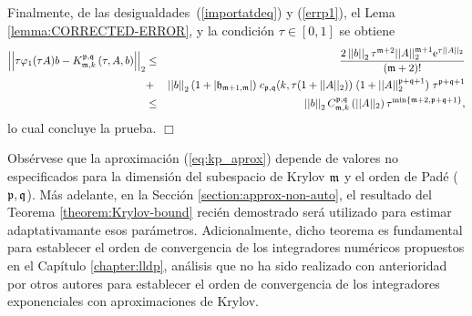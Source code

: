 Finalmente, de las desigualdades~(\ref{importatdeq}) y (\ref{errp1}), el Lema \ref{lemma:CORRECTED-ERROR}, y la condición $\tau \in [0,1]$ se obtiene
\begin{eqnarray*}
	\left\lvert\left\lvert  \tau \varphi_1(\tau A)b-  K_{\mathfrak{m},k}^{\mathfrak{p},\mathfrak{q}}\left( \tau,  A , b \right)\right\rvert\right\rvert_2
	&\leq& \frac{2 \left\lvert \left\lvert b \right\rvert \right\rvert_2 \tau^{\mathfrak{m}+2}  \vert\lvert A\rvert\rvert^{\mathfrak{m}+1}_2
		\mathrm{e}^{\tau \lvert\lvert A\rvert\rvert_2}}{(\mathfrak{m}+2)!}\\
	&+&
	\left\lvert \left\lvert b \right\rvert \right\rvert_2 (1+\lvert\mathfrak{h}_{\mathfrak{m}+1,\mathfrak{m}}\rvert) \; c_{\mathfrak{p},\mathfrak{q}}(k,\tau (1+\lvert\lvert A \rvert\rvert_2))
	\; (1 + \lvert\lvert A \rvert\rvert_2^{\mathfrak{p}+\mathfrak{q}+1}) \; \tau^{\mathfrak{p}+\mathfrak{q}+1}\\
	& \leq & \left\lvert \left\lvert b \right\rvert \right\rvert_2 C_{\mathfrak{m},k}^{\mathfrak{p},\mathfrak{q}}\left(\lvert\lvert A \rvert\rvert_2\right)\tau^{\mathrm{min}\left\{ \mathfrak{m}+2,\mathfrak{p}+\mathfrak{q}+1 \right\}},
\end{eqnarray*}
lo cual concluye la prueba.
$\Box$

Obsérvese que la aproximación (\ref{eq:kp_aprox}) depende de valores no especificados para la dimensión del subespacio de Krylov $\mathfrak{m}$ y el orden de Padé ($\mathfrak{p},\mathfrak{q}$). Más adelante, en la Sección \ref{section:approx-non-auto}, el resultado del Teorema \ref{theorem:Krylov-bound} recién demostrado será utilizado para estimar adaptativamante esos parámetros. Adicionalmente, dicho teorema es fundamental para establecer el orden de convergencia de los integradores numéricos propuestos en el Capítulo \ref{chapter:lldp}, análisis que no ha sido realizado con anterioridad por otros autores para establecer el orden de convergencia de los integradores exponenciales con aproximaciones de Krylov.

